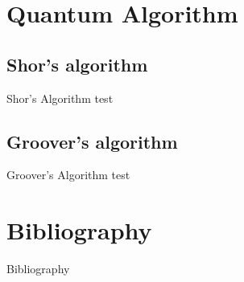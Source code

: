 \documentclass[svgnames,smaller]{beamer}
\begin{document}
\section{Quantum Algorithm}

\subsection{Shor's algorithm}

\begin{frame}[fragile]{Shor's Algorithm}
  test
\end{frame}


\subsection{Groover's algorithm}
\begin{frame}[fragile]{Groover's Algorithm}
test
\end{frame}

\section*{Bibliography}
\begin{frame}[allowframebreaks]{Bibliography}
\printbibliography
\end{frame}
\end{document}
